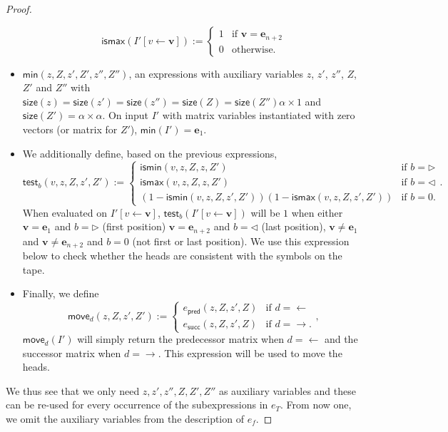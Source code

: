 \begin{proof}
\begin{itemize}
	$$\mathsf{ismax}(I'[v\gets\mathbf{v}]):=\begin{cases} 1 & \text{if $\mathbf{v}=\mathbf{e}_{n+2}$}\\
		0 & \text{otherwise}.
		\end{cases}$$
	\item $\mathsf{min}(z,Z,z',Z',z'',Z'')$, an expressions with
	auxiliary variables $z$, $z'$, $z''$, $Z$, $Z'$ and $Z''$ with $\mathsf{size}(z)=\mathsf{size}(z')=\mathsf{size}(z'')=\mathsf{size}(Z)=\mathsf{size}(Z'')\alpha\times 1$ and $\mathsf{size}(Z')=\alpha\times\alpha$. On input $I'$ with 
	matrix variables instantiated with zero vectors (or matrix for $Z'$),
 	 $\mathsf{min}(I')=\mathbf{e}_1$. 
	 		\item We additionally define, based on the previous expressions, 
			$$\mathsf{test}_b(v,z,Z,z',Z'):=\begin{cases} \mathsf{ismin}(v,z,Z,z,Z') & \text{if $b=\rhd$}\\
     \mathsf{ismax}(v,z,Z,z,Z') & \text{if $b=\lhd$}\\
	 (1-\mathsf{ismin}(v,z,Z,z',Z'))(1-\mathsf{ismax}(v,z,Z,z',Z')) & \text{if $b=0$}.
		\end{cases}.$$
	When evaluated on $I'[v\gets\mathbf{v}]$, $\mathsf{test}_b(I'[v\gets\mathbf{v}])$ will be $1$ when either
	$\mathbf{v}=\mathbf{e}_{1}$ and $b=\rhd$ (first position)
	$\mathbf{v}=\mathbf{e}_{n+2}$ and $b=\lhd$ (last position),
	$\mathbf{v}\neq \mathbf{e}_{1}$ and $\mathbf{v}\neq \mathbf{e}_{n+2}$  and $b=0$ (not first or last position). We use this expression below to check whether the heads are consistent with the symbols on the tape.
	
	
 \item Finally, we define
 $$
 \mathsf{move}_d(z,Z,z',Z'):=\begin{cases}
 e_{\mathsf{pred}}(z,Z,z',Z) & \text{if $d=\gets$}\\
  e_{\mathsf{succ}}(z,Z,z',Z) & \text{if $d=\to$}. 
 \end{cases},
 $$
 $\mathsf{move}_d(I')$ will simply return the predecessor matrix when $d=\gets$ and the successor matrix when $d=\to$. This expression will be used to move the heads.
\end{itemize}
We thus see that we only need $z,z',z'',Z,Z',Z''$ as auxiliary variables and these can be re-used for every occurrence of the subexpressions in $e_T$. From now one, we omit the auxiliary variables from the description of $e_f$.


\end{proof}
